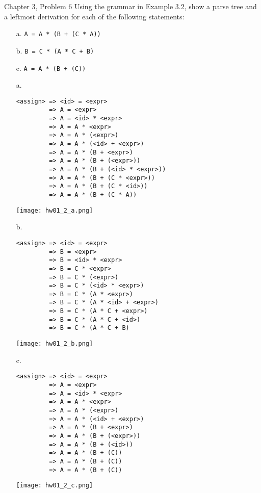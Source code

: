 \documentclass[11pt]{article}
\begin{document}
\newpage

\begin{ps}
\begin{problemcit}{Chapter 3, Problem 6} Using the grammar in Example 3.2, show a parse tree and a leftmost derivation for each of the following statements:
  \begin{itemize}
    \item[a.] \verb|A = A * (B + (C * A))|
    \item[b.] \verb|B = C * (A * C + B)|
    \item[c.] \verb|A = A * (B + (C))|
  \end{itemize}
\end{problemcit}
\begin{soln}
  \begin{itemize}
    \item[a.] 
      \begin{verbatim}
<assign> => <id> = <expr>
         => A = <expr>
         => A = <id> * <expr>
         => A = A * <expr>
         => A = A * (<expr>)
         => A = A * (<id> + <expr>)
         => A = A * (B + <expr>)
         => A = A * (B + (<expr>))
         => A = A * (B + (<id> * <expr>))
         => A = A * (B + (C * <expr>))
         => A = A * (B + (C * <id>))
         => A = A * (B + (C * A))
      \end{verbatim}
      \texttt{[image: hw01\_2\_a.png]}

\newpage

    \item[b.] 
       \begin{verbatim}
<assign> => <id> = <expr>
         => B = <expr>
         => B = <id> * <expr>
         => B = C * <expr>
         => B = C * (<expr>)
         => B = C * (<id> * <expr>)
         => B = C * (A * <expr>)
         => B = C * (A * <id> + <expr>)
         => B = C * (A * C + <expr>)
         => B = C * (A * C + <id>)
         => B = C * (A * C + B)
      \end{verbatim}
      \texttt{[image: hw01\_2\_b.png]}

\newpage
      
    \item[c.]
        \begin{verbatim}
<assign> => <id> = <expr>
         => A = <expr>
         => A = <id> * <expr>
         => A = A * <expr>
         => A = A * (<expr>)
         => A = A * (<id> + <expr>)
         => A = A * (B + <expr>)
         => A = A * (B + (<expr>))
         => A = A * (B + (<id>))
         => A = A * (B + (C))
         => A = A * (B + (C))
         => A = A * (B + (C))
      \end{verbatim}
      \texttt{[image: hw01\_2\_c.png]}
  \end{itemize}
\end{soln}
\end{ps}
\end{document}
